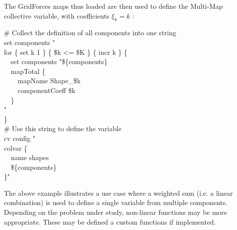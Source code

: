 {{The GridForces maps thus loaded are then used to define the Multi-Map collective variable, with coefficients $\xi_k = k$ \cite{Fiorin2020}:\\
\begin{mdexampleinput}
  \-\# Collect the definition of all components into one string\\
  \-set components "\\
  \-for \{ set k 1 \} \{ \$k <= \$K \} \{ incr k \} \{\\
  \-~~set components "\$\{components\}\\
  \-~~mapTotal \{\\
  \-~~~~mapName Shape\_\$k\\
  \-~~~~componentCoeff \$k\\
  \-~~\}\\
  \-"\\
  \-\}\\
  \-\# Use this string to define the variable\\
  \-cv config "\\
  \-colvar \{\\
  \-\-~~name shapes\\
  \-\-~~\$\{components\}\\
  \-\}"
\end{mdexampleinput}


The above example illustrates a use case where a weighted sum (i.e.{} a linear combination) is used to define a single variable from multiple components.
Depending on the problem under study, non-linear functions may be more appropriate.
These may be defined a custom functions if implemented.
} %

}\fi %



